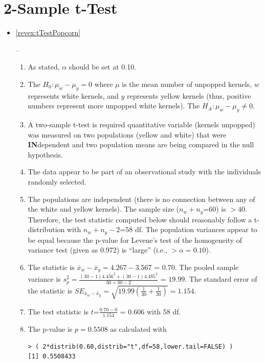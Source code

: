 \documentclass[10pt,openany]{book}\usepackage[]{graphicx}\usepackage[]{color}
\makeatletter
\newenvironment{kframe}{%
 \def\at@end@of@kframe{}%
 \ifinner\ifhmode%
  \def\at@end@of@kframe{\end{minipage}}%
  \begin{minipage}{\columnwidth}%
 \fi\fi%
 \def\FrameCommand##1{\hskip\@totalleftmargin \hskip-\fboxsep
 \colorbox{shadecolor}{##1}\hskip-\fboxsep
     \hskip-\linewidth \hskip-\@totalleftmargin \hskip\columnwidth}%
 \MakeFramed {\advance\hsize-\width
   \@totalleftmargin\z@ \linewidth\hsize
   \@setminipage}}%
 {\par\unskip\endMakeFramed%
 \at@end@of@kframe}
\newenvironment{knitrout}{}{} %
\makeatother
\begin{document}
\section*{2-Sample t-Test}
\begin{itemize}
  \item \hypertarget{ans:tTestPopcorn}{\ref{revex:tTestPopcorn}} --
    \begin{enumerate}
      \item As stated, $\alpha$ should be set at 0.10.
      \item The $H_{0}:\mu_{w}-\mu_{y}=0$ where $\mu$ is the mean number of unpopped kernels, $w$ represents white kernels, and $y$ represents yellow kernels (thus, positive numbers represent more unpopped white kernels).  The $H_{A}:\mu_{w}-\mu_{y}\neq0$.
      \item A two-sample t-test is required quantitative variable (kernels unpopped) was measured on two populations (yellow and white) that were \textbf{IN}dependent and two population means are being compared in the null hypothesis.
      \item The data appear to be part of an observational study with the individuals randomly selected.
      \item The populations are independent (there is no connection between any of the white and yellow kernels).  The sample size ($n_{w}+n_{y}$=60) is $>40$.  Therefore, the test statistic computed below should reasonably follow a t-distribution with $n_{w}+n_{y}-2$=$58$ df.  The population variances appear to be equal because the p-value for Levene's test of the homogeneity of variance test (given as 0.972) is ``large'' (i.e., $>\alpha=0.10$).
      \item The statistic is $\bar{x}_{w}-\bar{x}_{y} = 4.267-3.567$ = $0.70$.  The pooled sample variance is $s_{p}^{2}=\frac{(30-1)4.456^{2}+(30-1)4.485^{2}}{30+30-2}$ = $19.99$.  The standard error of the statistic is $SE_{\bar{x}_{w}-\bar{x}_{y}}=\sqrt{19.99\left(\frac{1}{30}+\frac{1}{30} \right)} = 1.154$.
      \item The test statistic is $t$=$\frac{0.70-0}{1.154}$ = $0.606$ with 58 df.
      \item The p-value is $p=0.5508$ as calculated with
\begin{knitrout}
\color{fgcolor}\begin{kframe}
\begin{verbatim}
> ( 2*distrib(0.60,distrib="t",df=58,lower.tail=FALSE) )
[1] 0.5508433
\end{verbatim}
\end{kframe}


\end{knitrout}
\end{enumerate}
\end{itemize}
\end{document}
